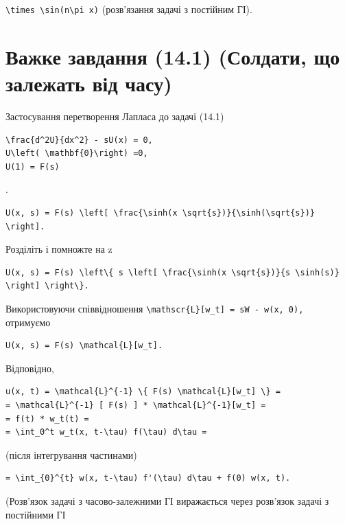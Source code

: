 \documentclass[
  ukrainian,
]{article}
\begin{document}
\texttt{\textbackslash{}times\ \textbackslash{}sin(n\textbackslash{}pi\ x)}
(розв'язання задачі з постійним ГІ).

\section{Важке завдання (14.1) (Солдати, що залежать від
часу)}\label{ux432ux430ux436ux43aux435-ux437ux430ux432ux434ux430ux43dux43dux44f-14.1-ux441ux43eux43bux434ux430ux442ux438-ux449ux43e-ux437ux430ux43bux435ux436ux430ux442ux44c-ux432ux456ux434-ux447ux430ux441ux443}

Застосування перетворення Лапласа до задачі (14.1)

\begin{verbatim}
\frac{d^2U}{dx^2} - sU(x) = 0,
U\left( \mathbf{0}\right) =0,
U(1) = F(s)
\end{verbatim}

.

\begin{verbatim}
U(x, s) = F(s) \left[ \frac{\sinh(x \sqrt{s})}{\sinh(\sqrt{s})} \right].
\end{verbatim}

Розділіть і помножте на z

\begin{verbatim}
U(x, s) = F(s) \left\{ s \left[ \frac{\sinh(x \sqrt{s})}{s \sinh(s)} \right] \right\}.
\end{verbatim}

Використовуючи співвідношення
\texttt{\textbackslash{}mathscr\{L\}{[}w\_t{]}\ =\ sW\ -\ w(x,\ 0),}
отримуємо

\begin{verbatim}
U(x, s) = F(s) \mathcal{L}[w_t].
\end{verbatim}

Відповідно,

\begin{verbatim}
u(x, t) = \mathcal{L}^{-1} \{ F(s) \mathcal{L}[w_t] \} =
= \mathcal{L}^{-1} [ F(s) ] * \mathcal{L}^{-1}[w_t] =
= f(t) * w_t(t) =
= \int_0^t w_t(x, t-\tau) f(\tau) d\tau =
\end{verbatim}

(після інтегрування частинами)

\begin{verbatim}
= \int_{0}^{t} w(x, t-\tau) f'(\tau) d\tau + f(0) w(x, t).
\end{verbatim}

(Розв'язок задачі з часово-залежними ГІ виражається через розв'язок
задачі з постійними ГІ
\end{document}
